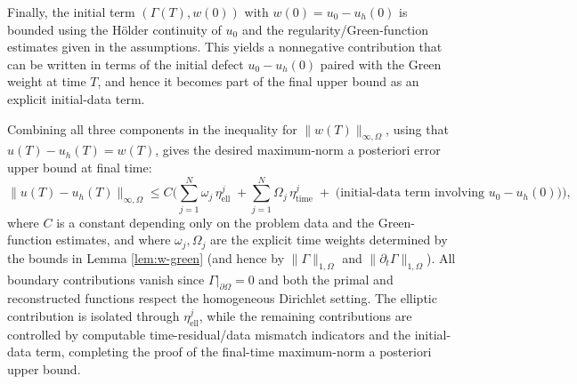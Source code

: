 \documentclass[11pt]{article}
\begin{document}
Finally, the initial term \((\Gamma(T),w(0))\) with \(w(0)=u_0-u_h(0)\) is bounded using the Hölder continuity of \(u_0\) and the regularity/Green-function estimates given in the assumptions. This yields a nonnegative contribution that can be written in terms of the initial defect \(u_0-u_h(0)\) paired with the Green weight at time \(T\), and hence it becomes part of the final upper bound as an explicit initial-data term.

Combining all three components in the inequality for \(\|w(T)\|_{\infty,\Omega}\), using that \(u(T)-u_h(T)=w(T)\), gives the desired maximum-norm a posteriori error upper bound at final time:
\[
\|u(T)-u_h(T)\|_{\infty,\Omega}\le C\Big(\sum_{j=1}^N \omega_j\,\eta^j_{\mathrm{ell}}\;+
\sum_{j=1}^N \Omega_j\,\eta^j_{\mathrm{time}}\;+\;
\text{(initial-data term involving }u_0-u_h(0)\text{)}\Big),
\]
where \(C\) is a constant depending only on the problem data and the Green-function estimates, and where \(\omega_j,\Omega_j\) are the explicit time weights determined by the bounds in Lemma \ref{lem:w-green} (and hence by \(\|\Gamma\|_{1,\Omega}\) and \(\|\partial_t\Gamma\|_{1,\Omega}\)). All boundary contributions vanish since \(\Gamma|_{\partial\Omega}=0\) and both the primal and reconstructed functions respect the homogeneous Dirichlet setting. The elliptic contribution is isolated through \(\eta^j_{\mathrm{ell}}\), while the remaining contributions are controlled by computable time-residual/data mismatch indicators and the initial-data term, completing the proof of the final-time maximum-norm a posteriori upper bound.
\end{document}

